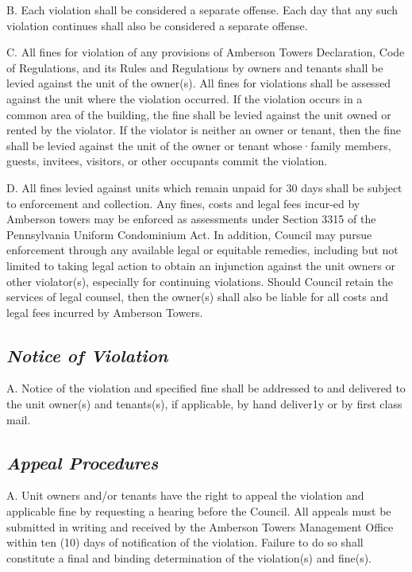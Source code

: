 \documentclass[
]{book}
\begin{document}
B. Each violation shall be considered a separate offense. Each day that any such violation continues shall also be considered a separate offense.

C. All fines for violation of any provisions of Amberson Towers Declaration, Code of Regulations, and its Rules and Regulations by owners and tenants shall be levied against the unit of the owner(s). All fines for violations shall be assessed against the unit where the violation occurred. If the violation occurs in a common area of the building, the fine shall be levied against the unit owned or rented by the violator. If the violator is neither an owner or tenant, then the fine shall be levied against the unit of the owner or tenant whose·family members, guests, invitees, visitors, or other occupants commit the violation.

D. All fines levied against units which remain unpaid for 30 days shall be subject to enforcement and collection. Any fines, costs and legal fees incur-ed by Amberson towers may be enforced as assessments under Section 3315 of the Pennsylvania Uniform Condominium Act. In addition, Council may pursue enforcement through any available legal or equitable remedies, including but not limited to taking legal action to obtain an injunction against the unit owners or other violator(s), especially for continuing violations. Should Council retain the services of legal counsel, then the owner(s) shall also be liable for all costs and legal fees incurred by Amberson Towers.

\hypertarget{notice-of-violation}{%
\subsection*{\texorpdfstring{\emph{Notice of Violation}}{Notice of Violation}}\label{notice-of-violation}}

A. Notice of the violation and specified fine shall be addressed to and delivered to the unit owner(s) and tenants(s), if applicable, by hand deliver1y or by first class mail.

\hypertarget{appeal-procedures}{%
\subsection*{\texorpdfstring{\emph{Appeal Procedures}}{Appeal Procedures}}\label{appeal-procedures}}

A. Unit owners and/or tenants have the right to appeal the violation and applicable fine by requesting a hearing before the Council. All appeals must be submitted in writing and received by the Amberson Towers Management Office within ten (10) days of notification of the violation. Failure to do so shall constitute a final and binding determination of the violation(s) and fine(s).
\end{document}
